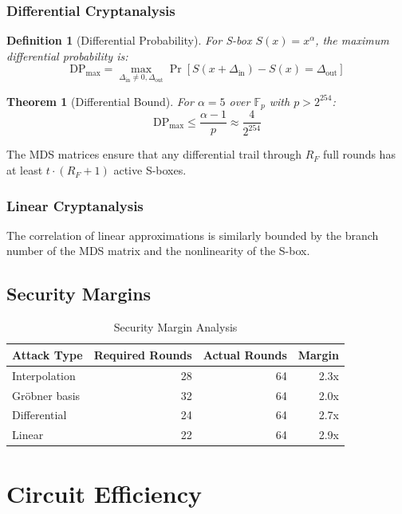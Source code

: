 \documentclass[11pt,a4paper]{article}
\newtheorem{theorem}{Theorem}
\newtheorem{definition}{Definition}
\begin{document}
\subsubsection{Differential Cryptanalysis}

\begin{definition}[Differential Probability]
For S-box $S(x) = x^\alpha$, the maximum differential probability is:
\[
\text{DP}_{\max} = \max_{\Delta_{\text{in}} \neq 0, \Delta_{\text{out}}} \Pr[S(x + \Delta_{\text{in}}) - S(x) = \Delta_{\text{out}}]
\]
\end{definition}

\begin{theorem}[Differential Bound]
For $\alpha = 5$ over $\mathbb{F}_p$ with $p > 2^{254}$:
\[
\text{DP}_{\max} \leq \frac{\alpha - 1}{p} \approx \frac{4}{2^{254}}
\]
\end{theorem}

The MDS matrices ensure that any differential trail through $R_F$ full rounds has at least $t \cdot (R_F + 1)$ active S-boxes.

\subsubsection{Linear Cryptanalysis}

The correlation of linear approximations is similarly bounded by the branch number of the MDS matrix and the nonlinearity of the S-box.

\subsection{Security Margins}

\begin{table}[htbp]
\centering
\caption{Security Margin Analysis}
\label{tab:security}
\begin{tabular}{@{}lrrr@{}}
\toprule
Attack Type & Required Rounds & Actual Rounds & Margin \\
\midrule
Interpolation & 28 & 64 & 2.3x \\
Gröbner basis & 32 & 64 & 2.0x \\
Differential & 24 & 64 & 2.7x \\
Linear & 22 & 64 & 2.9x \\
\bottomrule
\end{tabular}
\end{table}

\section{Circuit Efficiency}
\end{document}
